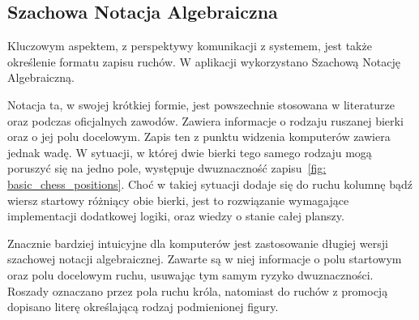 \subsection{Szachowa Notacja Algebraiczna}
\label{subsec:notacja-algebraiczna}

Kluczowym aspektem, z perspektywy komunikacji z systemem, jest także określenie formatu zapisu ruchów.
W aplikacji wykorzystano Szachową Notację Algebraiczną.

Notacja ta, w swojej krótkiej formie, jest powszechnie stosowana w literaturze oraz podczas oficjalnych zawodów.
Zawiera informacje o rodzaju ruszanej bierki oraz o jej polu docelowym.
Zapis ten z punktu widzenia komputerów zawiera jednak wadę.
W sytuacji, w której dwie bierki tego samego rodzaju mogą poruszyć się na jedno pole, występuje dwuznaczność zapisu~\ref{fig: basic_chess_positions}.
Choć w takiej sytuacji dodaje się do ruchu kolumnę bądź wiersz startowy różniący obie bierki, jest to rozwiązanie wymagające implementacji dodatkowej logiki, oraz wiedzy o stanie całej planszy.

Znacznie bardziej intuicyjne dla komputerów jest zastosowanie długiej wersji szachowej notacji algebraicznej.
Zawarte są w niej informacje o polu startowym oraz polu docelowym ruchu, usuwając tym samym ryzyko dwuznaczności.
Roszady oznaczano przez pola ruchu króla, natomiast do ruchów z promocją dopisano literę określającą rodzaj podmienionej figury.

